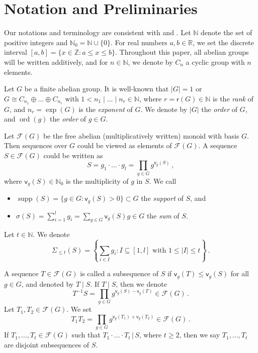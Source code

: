 \documentclass[11pt]{amsart}
\theoremstyle{definition}
\newcommand{\N}{\mathbb N}
\DeclareMathOperator{\ord}{ord}
\DeclareMathOperator{\supp}{supp}
\renewcommand{\t}{\, | \,}
\numberwithin{equation}{section}
\begin{document}
\section{Notation and Preliminaries}\label{Sec-Prelim}



Our notations and terminology are consistent with \cite{GE} and \cite{Gr-book}. Let $\mathbb{N}$ denote the set of positive integers  and $\mathbb{N}_0=\mathbb{N}\cup\{0\}$. For real numbers $a, b\in \mathbb{R}$, we set the discrete interval $[a, b]=\{x\in \mathbb{Z}\colon a\leq x\leq b\}$.  Throughout this paper, all abelian groups will be written additively, and for $n\in \mathbb{N}$, we denote by $C_n$ a cyclic group with $n$ elements.

Let $G$ be a finite abelian group. It is well-known that $|G|=1$ or $G\cong C_{n_1}\oplus \ldots \oplus C_{n_r}$ with $1<n_1\mid \ldots \mid n_r\in \mathbb{N}$, where $r=\mathsf{r}(G)\in \mathbb{N}$ is the \emph{rank} of $G$, and $n_r={\exp}(G)$ is the \emph{exponent} of $G$. We denote by $|G|$ the \emph{order} of $G$, and $\ord(g)$ the \emph{order} of  $g\in G$. 

Let $\mathcal F(G)$ be the free abelian (multiplicatively written) monoid with basis $G$. Then sequences over $G$ could be viewed as  elements of $\mathcal F(G)$. A  sequence $S\in \mathcal F(G)$ could be written as 
$$S=g_1\cdot \ldots \cdot g_l=\prod_{g\in G}g^{\mathsf v_{g}(S)}\,,$$
where  $\mathsf v_{g}(S)\in \mathbb{N}_0$ is the multiplicity of $g$ in $S$. 
We call
\begin{itemize}
	\item $\supp(S)=\{g\in G\colon \mathsf v_g(S)>0\}\subset G$ the \emph{support} of $S$, and
	\item $\sigma(S)=\sum_{i=1}^{l}g_i=\sum_{g\in G}\mathsf v_g(S)g\in G$ the \emph{sum} of $S$. 	
\end{itemize}
Let $t\in \N$. We denote  $$\Sigma_{\le t}(S)=\left\{\sum_{i\in I}g_i\colon I\subseteq [1, l] \mbox{ with } 1\leq |I|\leq t\right\}\,.$$ 



A sequence $T\in \mathcal F(G)$ is called a subsequence of $S$ if $\mathsf v_{g}(T)\leq \mathsf v_{g}(S)$ for all $g\in G$, and denoted by $T\mid S$. If $T\mid S$, then we denote
$$T^{-1} S=\prod_{g\in G}g^{\mathsf v_g(S)-\mathsf v_g(T)}\in \mathcal F(G)\,.$$
Let $T_1, T_2\in \mathcal F(G)$.  We set
$$T_1 T_2=\prod_{g\in G}g^{\mathsf v_{g}(T_1)+\mathsf v_{g}(T_2)}\in \mathcal{F}(G)\,.$$
If $T_1,\ldots, T_t\in \mathcal F(G)$ such that $T_1\cdot\ldots\cdot T_t\t S$, where $t\ge 2$, then 
 we say $T_1,\ldots,T_t$ are disjoint subsequences of $S$.
\end{document}
